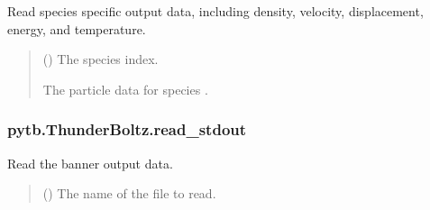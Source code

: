 \documentclass[letterpaper,10pt,english,openany,oneside]{sphinxmanual}
\begin{document}
\begin{fulllineitems}
\begin{fulllineitems}
\label{\detokenize{api/pytb.ThunderBoltz.read_particle_table:pytb.ThunderBoltz.read_particle_table}}
\pysigstartsignatures
{}
\pysigstopsignatures
\sphinxAtStartPar
Read species specific output data, including
density, velocity, displacement, energy, and temperature.
\begin{quote}\begin{description}
\sphinxAtStartPar
{} () \textendash{} The species index.

\sphinxAtStartPar
The particle data for
species .

\sphinxAtStartPar
{}

\end{description}\end{quote}

\end{fulllineitems}


\sphinxstepscope


\subsubsection{pytb.ThunderBoltz.read\_stdout}
\label{\detokenize{api/pytb.ThunderBoltz.read_stdout:pytb-thunderboltz-read-stdout}}\label{\detokenize{api/pytb.ThunderBoltz.read_stdout::doc}}

\begin{fulllineitems}
\label{\detokenize{api/pytb.ThunderBoltz.read_stdout:pytb.ThunderBoltz.read_stdout}}
\pysigstartsignatures
{}
\pysigstopsignatures
\sphinxAtStartPar
Read the banner output data.
\begin{quote}\begin{description}
\sphinxAtStartPar
{} () \textendash{} The name of the  file to read.


\end{description}
\end{quote}
\end{fulllineitems}
\end{fulllineitems}
\end{document}
